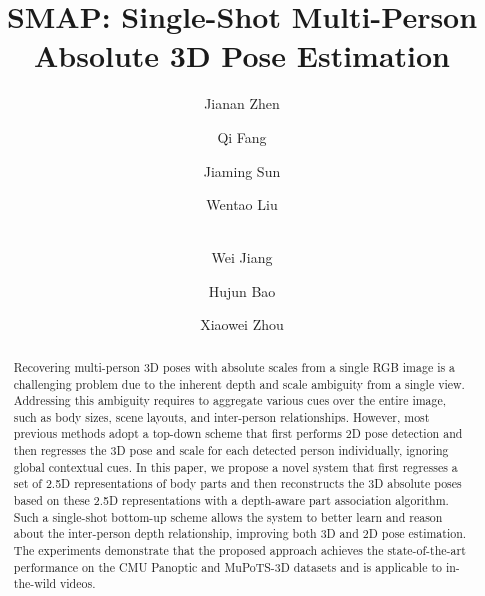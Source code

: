 \documentclass[runningheads]{llncs}
\begin{document}
\pagestyle{headings}
\mainmatter

\title{SMAP: Single-Shot Multi-Person \\Absolute 3D Pose Estimation} 


\author{Jianan Zhen \and Qi Fang \and Jiaming Sun \and Wentao Liu \and \\ Wei Jiang \and Hujun Bao \and Xiaowei Zhou}



\maketitle

\begin{abstract}
Recovering multi-person 3D poses with absolute scales from a single RGB image is a challenging problem due to the inherent depth and scale ambiguity from a single view. Addressing this ambiguity requires to aggregate various cues over the entire image, such as body sizes, scene layouts, and inter-person relationships. However, most previous methods adopt a top-down scheme that first performs 2D pose detection and then regresses the 3D pose and scale for each detected person individually, ignoring global contextual cues.  
In this paper, we propose a novel system that first regresses a set of 2.5D representations of body parts and then reconstructs the 3D absolute poses based on these 2.5D representations with a depth-aware part association algorithm. Such a single-shot bottom-up scheme allows the system to better learn and reason about the inter-person depth relationship, improving both 3D and 2D pose estimation. The experiments demonstrate that the proposed approach achieves the state-of-the-art performance on the CMU Panoptic and MuPoTS-3D datasets and is applicable to in-the-wild videos. {\renewcommand{\thefootnote}{\fnsymbol{footnote}} }

\end{abstract}
\end{document}
